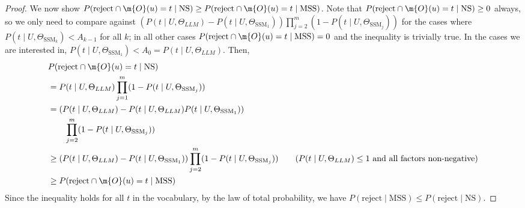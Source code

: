 \begin{proof}
We now show $P(\textrm{reject} \cap \m{O}(u)=t \mid \textrm{NS}) \geq P(\textrm{reject} \cap \m{O}(u)=t \mid \textrm{MSS})$. Note that $P(\textrm{reject} \cap \m{O}(u)=t \mid \textrm{NS}) \geq 0$ always, so we only need to compare against $(P(t \mid U, \Theta_{LLM})-P(t \mid U, \Theta_{\textrm{SSM}_1}))\prod_{j=2}^m (1-P(t \mid U, \Theta_{\textrm{SSM}_j}))$ for the cases where $P(t \mid U, \Theta_{\textrm{SSM}_k}) < A_{k-1}$ for all $k$; in all other cases $P(\textrm{reject} \cap \m{O}(u)=t \mid \textrm{MSS}) = 0$ and the inequality is trivially true. In the cases we are interested in, $P(t \mid U, \Theta_{\textrm{SSM}_1}) < A_0 = P(t \mid U, \Theta_{LLM})$. Then,
\begin{align*}
    &P(\textrm{reject} \cap \m{O}(u)=t \mid \textrm{NS}) \\
    &= P(t \mid U, \Theta_{LLM})\prod_{j=1}^m (1-P(t \mid U, \Theta_{\textrm{SSM}_j})) \\
    &= (P(t \mid U, \Theta_{LLM}) - P(t \mid U, \Theta_{LLM})P(t \mid U, \Theta_{\textrm{SSM}_1}))\\
    &\qquad \prod_{j=2}^m (1-P(t \mid U, \Theta_{\textrm{SSM}_j})) \\
    &\geq (P(t \mid U, \Theta_{LLM}) - P(t \mid U, \Theta_{\textrm{SSM}_1}))\prod_{j=2}^m (1-P(t \mid U, \Theta_{\textrm{SSM}_j})) \tag{$P(t \mid U, \Theta_{LLM}) \leq 1$ and all factors non-negative} \\
    &\geq P(\textrm{reject} \cap \m{O}(u)=t \mid \textrm{MSS})
\end{align*}
Since the inequality holds for all $t$ in the vocabulary, by the law of total probability, we have $P(\textrm{reject}\mid \textrm{MSS}) \leq P(\textrm{reject}\mid\textrm{NS})$.

\end{proof}

